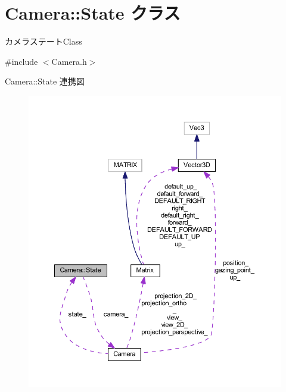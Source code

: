 \hypertarget{class_camera_1_1_state}{}\section{Camera\+:\+:State クラス}
\label{class_camera_1_1_state}


カメラステート\+Class  




{\ttfamily \#include $<$Camera.\+h$>$}



Camera\+:\+:State 連携図\nopagebreak
\begin{figure}[H]
\begin{center}
\leavevmode
\includegraphics[width=350pt]{class_camera_1_1_state__coll__graph}
\end{center}
\end{figure}
